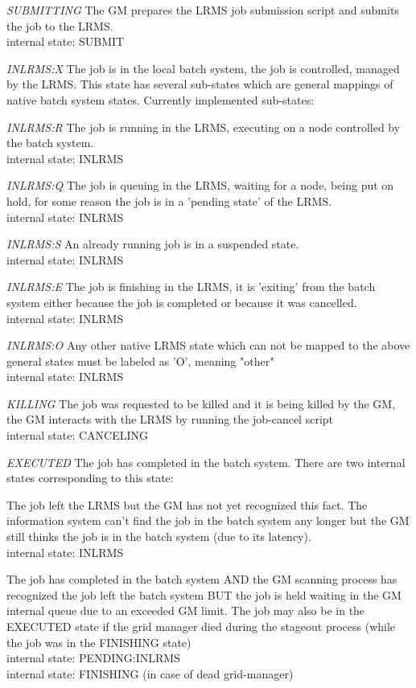 \documentclass{article}
\begin{document}
{\it SUBMITTING}
The GM prepares the LRMS job submission script
and submits the job to the LRMS. \\
internal state: SUBMIT

{\it INLRMS:X}
The job is in the local batch system, the job is 
controlled, managed by the LRMS. This state has several sub-states
which are general mappings of native batch system states.
Currently implemented sub-states:

{\it INLRMS:R} 
The job is running in the LRMS, executing on a node controlled by 
the batch system. \\
internal state: INLRMS

{\it INLRMS:Q}
The job is queuing in the LRMS, waiting for a node, 
being put on hold, for some reason the
job is in a 'pending state' of the LRMS.\\
internal state: INLRMS

{\it INLRMS:S} 
An already running job is in a suspended state.\\
internal state: INLRMS

{\it INLRMS:E} 
The job is finishing in the LRMS, it is 'exiting' from the batch system
either because the job is completed or because it was cancelled.\\
internal state: INLRMS

{\it INLRMS:O} 
Any other native LRMS state which can not be mapped to the above
general states must be labeled as 'O', meaning "other"\\
internal state: INLRMS


{\it KILLING}
The job was requested to be killed and it is being killed by the GM, 
the GM interacts with the LRMS by running the job-cancel script \\
internal state: CANCELING


{\it EXECUTED}
The job has completed in the batch system.  
There are two internal states corresponding to this state:

The job left the LRMS but the GM has not yet recognized this fact.
The information system can't find the job in the batch system any longer 
but the GM still thinks the job is in the batch system (due to its latency). \\
internal state: INLRMS 

The job has completed in the batch system
AND the GM scanning process has recognized the job left the batch system
BUT the job is held waiting in the GM internal queue due to an exceeded
GM limit. 
The job may also be in the EXECUTED state if the grid manager died during the 
stageout process (while the job was in the FINISHING state) \\
internal state: PENDING:INLRMS \\
internal state: FINISHING (in case of dead grid-manager)
\end{document}

